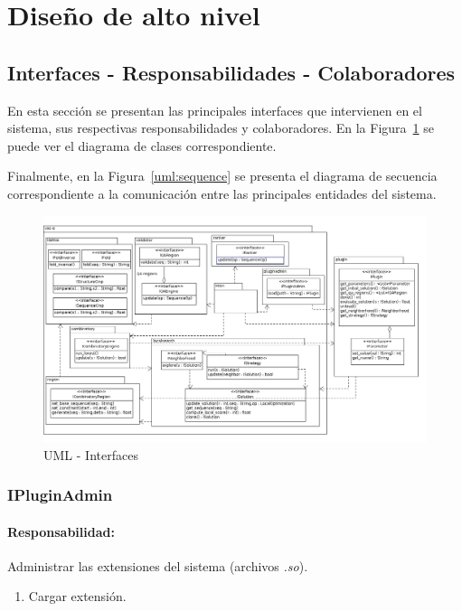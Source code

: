 \section{Dise\~no de alto nivel}
\label{hld}

\subsection{Interfaces - Responsabilidades - Colaboradores}

En esta secci\'on se presentan las principales interfaces que intervienen en el
sistema, sus respectivas responsabilidades y colaboradores. En la
Figura~\ref{uml:hld} se puede ver el diagrama de clases correspondiente.

Finalmente, en la Figura~\ref{uml:sequence} se presenta el diagrama de
secuencia correspondiente a la comunicaci\'on entre las principales entidades
del sistema.

\begin{figure}  
  \centering
  \includegraphics[scale=0.5, angle=90]{hld.png}  
  \caption{UML - Interfaces}
  \label{uml:hld}
\end{figure} 

  \subsubsection{IPluginAdmin}
    \paragraph{Responsabilidad:} Administrar las extensiones del sistema
(archivos \textit{.so}).    
      \begin{enumerate}
       \item Cargar extensi\'on.       
      \end{enumerate}    

